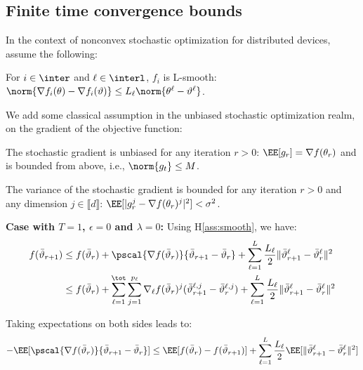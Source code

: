 \documentclass{article}
\begin{document}
\subsection{Finite time convergence bounds}



In the context of nonconvex stochastic optimization for distributed devices, assume the following:

\begin{assumption}\label{ass:smooth}
For $i \in \inter$ and $\ell \in \interl$, $f_i$ is  L-smooth: $\norm{\nabla f_i (\theta) - \nabla f_i (\vartheta)} \leq L_\ell \norm{\theta^\ell-\vartheta^\ell}$.
\end{assumption}
We add some classical assumption in the unbiased stochastic optimization realm, on the gradient of the objective function:
\begin{assumption}\label{ass:boundgrad}
The stochastic gradient is unbiased for any iteration $r>0$: $\EE[g_r] = \nabla f(\theta_r)$ and is bounded from above, i.e., $\norm{g_t} \leq M$.
\end{assumption}

\begin{assumption}
The variance of the stochastic gradient is bounded for any iteration $r>0$ and any dimension $j \in \llbracket d \rrbracket$: $\EE[|g_r^j - \nabla f(\theta_r)^j|^2] < \sigma^2$.
\end{assumption}


\textbf{Case with $T=1$, $\epsilon = 0$ and $\lambda = 0$:}
Using H\ref{ass:smooth}, we have:
\begin{align}\notag
f(\bar{\vartheta}_{r+1}) &  \leq f(\bar{\vartheta}_r) + \pscal{\nabla f(\bar{\vartheta}_r)}{\bar{\vartheta}_{r+1} - \bar{\vartheta}_r} + \sum_{\ell =1}^L \frac{L_\ell}{2} \| \bar{\vartheta}^\ell_{r+1} - \bar{\vartheta}^\ell_r \|^2\\
&  \leq f(\bar{\vartheta}_r) + \sum_{\ell=1}^\tot \sum_{j=1}^{p_\ell} \nabla_{\ell} f(\bar{\vartheta}_r)^j (\bar{\vartheta}^{\ell,j}_{r+1} - \bar{\vartheta}^{\ell,j}_r) + \sum_{\ell =1}^L \frac{L_\ell}{2} \| \bar{\vartheta}^\ell_{r+1} - \bar{\vartheta}^\ell_r \|^2
\end{align}

Taking expectations on both sides leads to:
\begin{align}\label{eq:main}
- \EE[  \pscal{\nabla f(\bar{\vartheta}_r)}{\bar{\vartheta}_{r+1} - \bar{\vartheta}_r}]  \leq  \EE[ f(\bar{\vartheta}_r) - f(\bar{\vartheta}_{r+1})] + \sum_{\ell =1}^L \frac{L_\ell}{2} \EE[  \| \bar{\vartheta}^\ell_{r+1} - \bar{\vartheta}^\ell_r \|^2]
\end{align}
\end{document}
